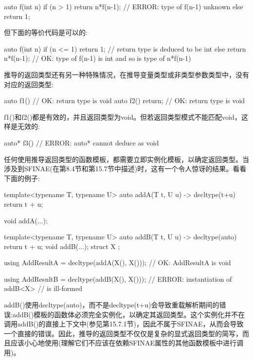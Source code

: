 \begin{cpp}
auto f(int n)
{
	if (n > 1) {
		return n*f(n-1); // ERROR: type of f(n-1) unknown
	} else {
		return 1;
	}
}
\end{cpp}

但下面的等价代码是可以的:

\begin{cpp}
auto f(int n)
{
	if (n <= 1) {
		return 1; // return type is deduced to be int
	} else {
		return n*f(n-1); // OK: type of f(n-1) is int and so is type of n*f(n-1)
	}
}
\end{cpp}

推导的返回类型还有另一种特殊情况，在推导变量类型或非类型参数类型中，没有对应的返回类型:

\begin{cpp}
auto f1() { } // OK: return type is void
auto f2() { return; } // OK: return type is void
\end{cpp}

f1()和f2()都是有效的，并且返回类型为void。但若返回类型模式不能匹配void，这样是无效的:

\begin{cpp}
auto* f3() {} // ERROR: auto* cannot deduce as void
\end{cpp}

任何使用推导返回类型的函数模板，都需要立即实例化模板，以确定返回类型。当涉及到SFINAE(在第8.4节和第15.7节中描述)时，这有一个令人惊讶的结果。看看下面的例子:

\begin{cpp}
template<typename T, typename U>
auto addA(T t, U u) -> decltype(t+u)
{
	return t + u;
}

void addA(...);

template<typename T, typename U>
auto addB(T t, U u) -> decltype(auto)
{
	return t + u;
}
void addB(...);
struct X {
};

using AddResultA = decltype(addA(X(), X())); // OK: AddResultA is void

using AddResultB = decltype(addB(X(), X())); // ERROR: instantiation of addB<X>
// is ill-formed
\end{cpp}

addB()使用decltype(auto)，而不是decltype(t+u)会导致重载解析期间的错误:addB()模板的函数体必须完全实例化，以确定其返回类型。这个实例化并不在调用addB()的直接上下文中(参见第15.7.1节)，因此不属于SFINAE，从而会导致一个直接的错误。因此，推导的返回类型不仅仅是复杂的显式返回类型的简写，而且应该小心地使用(理解它们不应该在依赖SFINAE属性的其他函数模板中进行调用)。

